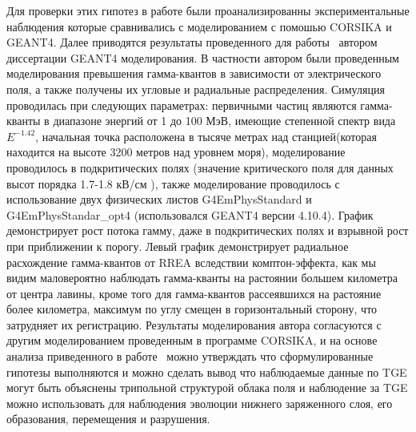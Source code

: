 Для проверки этих гипотез в работе были проанализированны экспериментальные наблюдения которые сравнивались с моделированием с помошью CORSIKA и GEANT4. Далее приводятся результаты проведенного для работы~\cite{PhysRevD.98.082001}  автором диссертации GEANT4 моделирования. В частности автором были проведенным моделирования превышения гамма-квантов в зависимости от электрического поля, а также получены их угловые и радиальные распределения. Симуляция проводилась при следующих параметрах: первичными частиц являются гамма-кванты в диапазоне энергий от 1 до 100 МэВ, имеющие степенной спектр вида $E^{-1.42}$, начальная точка расположена в тысяче метрах над станцией(которая находится на высоте 3200 метров над уровнем моря), моделирование проводилось в подкритических полях (значение критического поля для данных высот порядка 1.7-1.8 кВ/см
), также моделирование проводилось с использование двух физических листов G4EmPhysStandard и G4EmPhysStandar\_opt4 (использовался GEANT4 версии 4.10.4). График демонстрирует рост потока гамму, даже в подкритических полях и взрывной рост при приближении к порогу. Левый график демонстрирует радиальное расхождение гамма-квантов от RREA вследствии комптон-эффекта, как мы видим маловероятно наблюдать гамма-кванты на растоянии большем километра от центра лавины, кроме того для гамма-квантов рассеявшихся на растояние более километра, максимум по углу смещен в горизонтальный сторону, что затрудняет их регистрацию. Результаты моделирования автора согласуются с другим моделированием проведенным в программе CORSIKA, и на основе анализа приведенного в работе~\cite{PhysRevD.98.082001} можно утверждать что сформулированные гипотезы выполняются и можно сделать вывод что наблюдаемые данные по TGE могут быть объяснены трипольной структурой облака поля и наблюдение за TGE можно использовать для наблюдения эволюции нижнего заряженного слоя, его образования, перемещения и разрушения.